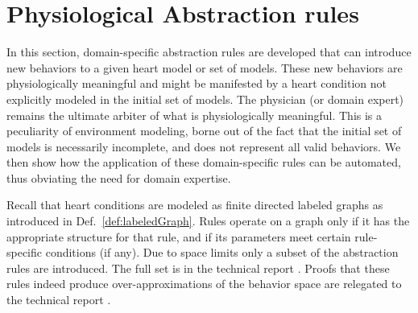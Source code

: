 \section{Physiological Abstraction rules}
\label{abstractionRules} 
In this section, domain-specific abstraction rules are developed that can introduce new behaviors to a given heart model or set of models. 
These new behaviors are physiologically meaningful and might be manifested by a heart condition not explicitly modeled in the initial set of models.
The physician (or domain expert) remains the ultimate arbiter of what is physiologically meaningful.
This is a peculiarity of environment modeling, borne out of the fact that the initial set of models is necessarily incomplete, and does not represent all valid behaviors.
We then show how the application of these domain-specific rules can be automated, thus obviating the need for domain expertise.

Recall that heart conditions are modeled as finite directed labeled graphs as introduced in Def.~\ref{def:labeledGraph}.
Rules operate on a graph only if it has the appropriate structure for that rule, and if its parameters meet certain rule-specific conditions (if any).
Due to space limits only a subset of the abstraction rules are introduced. 
The full set is in the technical report \cite{regar_tech}.
Proofs that these rules indeed produce over-approximations of the behavior space are relegated to the technical report \cite{regar_tech}.
%
%


